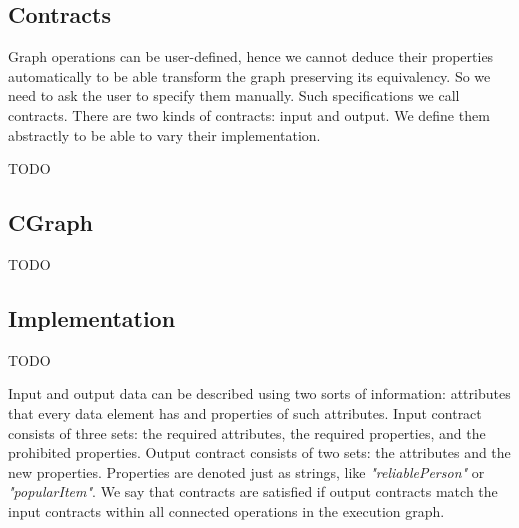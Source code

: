 

\subsection{Contracts}


Graph operations can be user-defined, hence we cannot deduce their properties automatically to be able transform the graph preserving its equivalency.
So we need to ask the user to specify them manually.
Such specifications we call contracts.
There are two kinds of contracts: input and output.
We define them abstractly to be able to vary their implementation.



TODO

\subsection{CGraph}

TODO

\subsection{Implementation}

TODO



Input and output data can be described using two sorts of information: attributes that every data element has and properties of such attributes.
Input contract consists of three sets: the required attributes, the required properties, and the prohibited properties.
Output contract consists of two sets: the attributes and the new properties.
Properties are denoted just as strings, like {\em "reliablePerson"} or {\em "popularItem"}.
We say that contracts are satisfied if output contracts match the input contracts within all connected operations in the execution graph.

